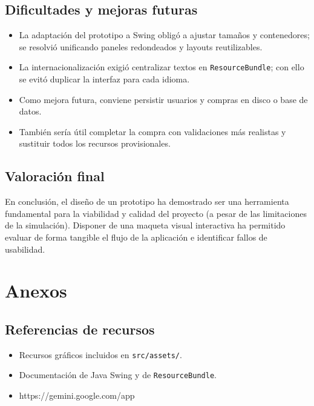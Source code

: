 \documentclass[12pt,a4paper]{article}
\begin{document}
\subsection*{Dificultades y mejoras futuras}
\begin{itemize}
	\item La adaptación del prototipo a Swing obligó a ajustar tamaños y contenedores; se resolvió unificando paneles redondeados y layouts reutilizables.
	\item La internacionalización exigió centralizar textos en \texttt{ResourceBundle}; con ello se evitó duplicar la interfaz para cada idioma.
	\item Como mejora futura, conviene persistir usuarios y compras en disco o base de datos.
	\item También sería útil completar la compra con validaciones más realistas y sustituir todos los recursos provisionales.
\end{itemize}

\subsection*{Valoración final}
En conclusión, el diseño de un prototipo ha demostrado ser una herramienta fundamental para la viabilidad y calidad del proyecto (a pesar de las limitaciones de la simulación). Disponer de una maqueta visual interactiva ha permitido evaluar de forma tangible el flujo de la aplicación e identificar fallos de usabilidad.
\appendix
\section{Anexos}

\subsection{Referencias de recursos}
\begin{itemize}
	\item Recursos gráficos incluidos en \texttt{src/assets/}.
	\item Documentación de Java Swing y de \texttt{ResourceBundle}.
	\item https://gemini.google.com/app
\end{itemize}
\end{document}

